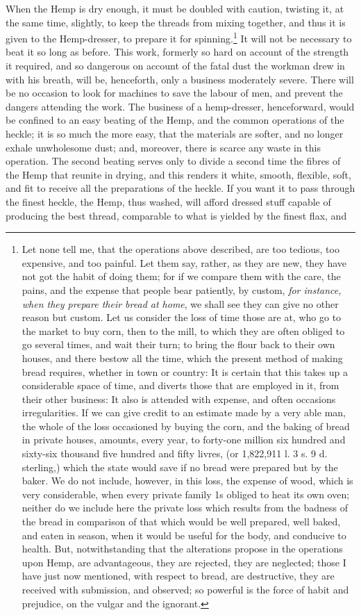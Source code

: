 \documentclass[a4paper, 11pt, oneside, polutonikogreek, english]{article}
\begin{document}
When the Hemp is dry enough, it must be doubled with caution, twisting it, at the same time, slightly, to keep the threads from mixing together, and thus it is given to the Hemp-dresser, to prepare it for spinning.\footnote{Let none tell me, that the operations above described, are too tedious, too expensive, and too painful. Let them say, rather, as they are new, they have not got the habit of doing them; for if we compare them with the care, the pains, and the expense that people bear patiently, by custom, \emph{for instance, when they prepare their bread at home}, we shall see they can give no other reason but custom. Let us consider the loss of time those are at, who go to the market to buy corn, then to the mill, to which they are often obliged to go several times, and wait their turn; to bring the flour back to their own houses, and there bestow all the time, which the present method of making bread requires, whether in town or country: It is certain that this takes up a considerable space of time, and diverts those that are employed in it, from their other business: It also is attended with expense, and often occasions irregularities. If we can give credit to an estimate made by a very able man, the whole of the loss occasioned by buying the corn, and the baking of bread in private houses, amounts, every year, to forty-one million six hundred and sixty-six thousand five hundred and fifty livres, (or 1,822,911 l. 3 s. 9 d. sterling,) which the state would save if no bread were prepared but by the baker. We do not include, however, in this loss, the expense of wood, which is very considerable, when every private family 1s obliged to heat its own oven; neither do we include here the private loss which results from the badness of the bread in comparison of that which would be well prepared, well baked, and eaten in season, when it would be useful for the body, and conducive to health. But, notwithstanding that the alterations propose in the operations upon Hemp, are advantageous, they are rejected, they are neglected; those I have just now mentioned, with respect to bread, are destructive, they are received with submission, and observed; so powerful is the force of habit and prejudice, on the vulgar and the ignorant.} It will not be necessary to beat it so long as before. This work, formerly so hard on account of the strength it required, and so dangerous on account of the fatal dust the workman drew in with his breath, will be, henceforth, only a business moderately severe. There will be no occasion to look for machines to save the labour of men, and prevent the dangers attending the work. The business of a hemp-dresser, henceforward, would be confined to an easy beating of the Hemp, and the common operations of the heckle; it is so much the more easy, that the materials are softer, and no longer exhale unwholesome dust; and, moreover, there is scarce any waste in this operation. The second beating serves only to divide a second time the fibres of the Hemp that reunite in drying, and this renders it white, smooth, flexible, soft, and fit to receive all the preparations of the heckle. If you want it to pass through the finest heckle, the Hemp, thus washed, will afford dressed stuff capable of producing the best thread, comparable to what is yielded by the finest flax, and 
\end{document}
